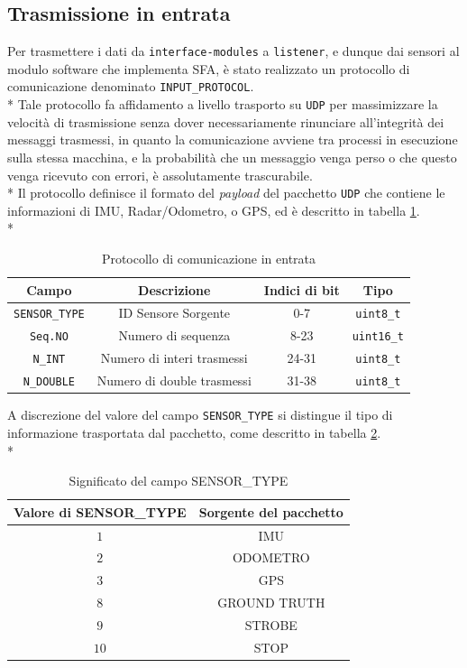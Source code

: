 \subsection{Trasmissione in entrata}
Per trasmettere i dati da \texttt{interface-modules} a \texttt{listener}, e dunque dai sensori al modulo software che implementa SFA, \`e stato realizzato un protocollo di comunicazione denominato \texttt{INPUT\_PROTOCOL}.\\*
Tale protocollo fa affidamento a livello trasporto su \texttt{UDP} per massimizzare la velocit\`a di trasmissione senza dover necessariamente rinunciare all'integrit\`a dei messaggi trasmessi, in quanto la comunicazione avviene tra processi in esecuzione sulla stessa macchina, e la probabilit\`a che un messaggio venga perso o che questo venga ricevuto con errori, \`e assolutamente trascurabile.\\*
Il protocollo definisce il formato del \emph{payload} del pacchetto \texttt{UDP} che contiene le informazioni di IMU, Radar/Odometro, o GPS, ed \`e descritto in tabella \ref{tab:protoin}.\\*
\begin{table}[h]
			\centering
\begin{tabular}{|c|c|c|c|}
	\hline 
	\textbf{Campo} & \textbf{Descrizione} & \textbf{Indici di bit} & \textbf{Tipo} \\ 
	\hline 
	\texttt{SENSOR\_TYPE} & ID Sensore Sorgente & 0-7 & \texttt{uint8\_t} \\ 
	\hline 
	\texttt{Seq.NO} & Numero di sequenza & 8-23 & \texttt{uint16\_t} \\ 
	\hline 
	\texttt{N\_INT} & Numero di interi trasmessi & 24-31 & \texttt{uint8\_t} \\ 
	\hline 
	\texttt{N\_DOUBLE} & Numero di double trasmessi & 31-38 & \texttt{uint8\_t} \\ 
	\hline 
\end{tabular} 
\caption{Protocollo di comunicazione in entrata}
\label{tab:protoin}
\end{table}
A discrezione del valore del campo \texttt{SENSOR\_TYPE} si distingue il tipo di informazione trasportata dal pacchetto, come descritto in tabella \ref{tab:sensors}.\\*
\begin{table}[h]
		\centering
	\begin{tabular}{|c|c|}
		\hline 
		\textbf{Valore di SENSOR\_TYPE} & \textbf{Sorgente del pacchetto} \\ 
		\hline 
		$1$ & IMU \\ 
		\hline 
		$2$ & ODOMETRO \\ 
		\hline 
		$3$ & GPS \\ 
		\hline 
		$8$ & GROUND TRUTH \\ 
		\hline 
		$9$ & STROBE \\ 
		\hline 
		$10$ & STOP \\ 
		\hline 
	\end{tabular} 
	\caption{Significato del campo SENSOR\_TYPE}
	\label{tab:sensors}
\end{table}
